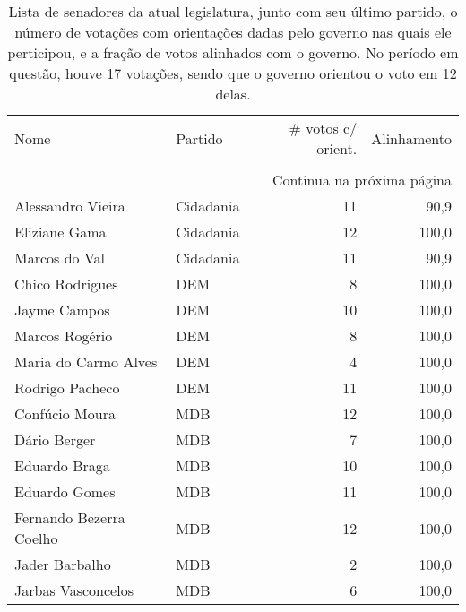 \begin{longtable}{llrr}
  \caption{Lista de senadores da atual legislatura, junto com seu último partido,
    o número de votações com orientações dadas pelo governo nas quais ele perticipou, e a fração de votos
  alinhados com o governo. No período em questão, houve 17 votações, sendo que o
  governo orientou o voto em 12 delas.}\\
\toprule
                    Nome &        Partido &  \# votos c/ orient. &  Alinhamento \\
                         &                &                     &              \\
\midrule
\endhead
\midrule
\multicolumn{4}{r}{{Continua na próxima página}} \\
\midrule
\endfoot

\bottomrule
\endlastfoot
       Alessandro Vieira &      Cidadania &                  11 &         90,9 \\
           Eliziane Gama &      Cidadania &                  12 &        100,0 \\
           Marcos do Val &      Cidadania &                  11 &         90,9 \\
         Chico Rodrigues &            DEM &                   8 &        100,0 \\
            Jayme Campos &            DEM &                  10 &        100,0 \\
          Marcos Rogério &            DEM &                   8 &        100,0 \\
    Maria do Carmo Alves &            DEM &                   4 &        100,0 \\
         Rodrigo Pacheco &            DEM &                  11 &        100,0 \\
          Confúcio Moura &            MDB &                  12 &        100,0 \\
            Dário Berger &            MDB &                   7 &        100,0 \\
           Eduardo Braga &            MDB &                  10 &        100,0 \\
           Eduardo Gomes &            MDB &                  11 &        100,0 \\
 Fernando Bezerra Coelho &            MDB &                  12 &        100,0 \\
          Jader Barbalho &            MDB &                   2 &        100,0 \\
      Jarbas Vasconcelos &            MDB &                   6 &        100,0 \\

\end{longtable}
